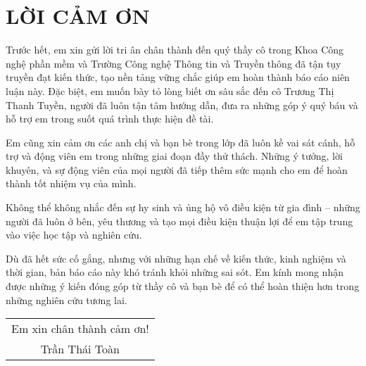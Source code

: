 \section*{\centering LỜI CẢM ƠN}

Trước hết, em xin gửi lời tri ân chân thành đến quý thầy cô trong Khoa Công nghệ phần mềm và Trường Công nghệ Thông tin và Truyền thông đã tận tụy truyền đạt kiến thức, tạo nền tảng vững chắc giúp em hoàn thành báo cáo niên luận này. Đặc biệt, em muốn bày tỏ lòng biết ơn sâu sắc đến cô Trương Thị Thanh Tuyền, người đã luôn tận tâm hướng dẫn, đưa ra những góp ý quý báu và hỗ trợ em trong suốt quá trình thực hiện đề tài.

Em cũng xin cảm ơn các anh chị và bạn bè trong lớp đã luôn kề vai sát cánh, hỗ trợ và động viên em trong những giai đoạn đầy thử thách. Những ý tưởng, lời khuyên, và sự động viên của mọi người đã tiếp thêm sức mạnh cho em để hoàn thành tốt nhiệm vụ của mình.

Không thể không nhắc đến sự hy sinh và ủng hộ vô điều kiện từ gia đình – những người đã luôn ở bên, yêu thương và tạo mọi điều kiện thuận lợi để em tập trung vào việc học tập và nghiên cứu.

Dù đã hết sức cố gắng, nhưng với những hạn chế về kiến thức, kinh nghiệm và thời gian, bản báo cáo này khó tránh khỏi những sai sót. Em kính mong nhận được những ý kiến đóng góp từ thầy cô và bạn bè để có thể hoàn thiện hơn trong những nghiên cứu tương lai.

\begin{flushright}
  \begin{tabular}{@{}c@{}}
    Em xin chân thành cảm ơn! \\
    Trần Thái Toàn
  \end{tabular}
\end{flushright}
